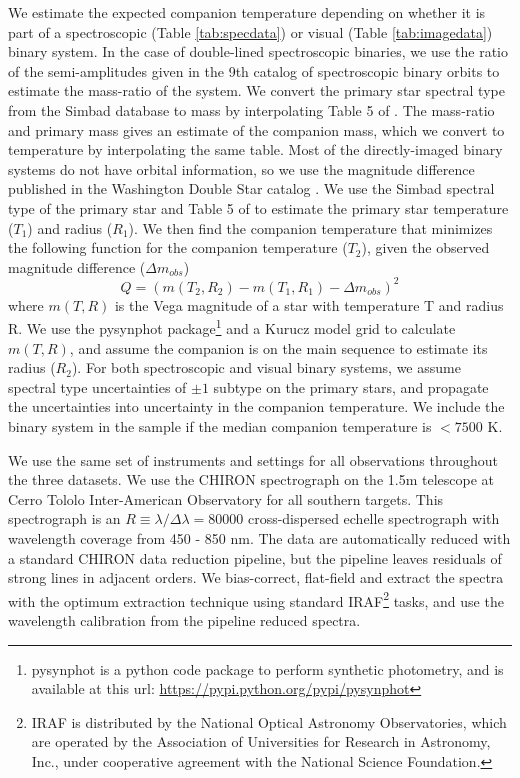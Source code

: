 \documentclass{emulateapj}
\begin{document}
We estimate the expected companion temperature depending on whether it is part of a spectroscopic (Table \ref{tab:specdata}) or visual (Table \ref{tab:imagedata}) binary system. In the case of double-lined spectroscopic binaries, we use the ratio of the semi-amplitudes given in the 9th catalog of spectroscopic binary orbits \citep[SB9,][]{SB9} to estimate the mass-ratio of the system. We convert the primary star spectral type from the Simbad database \citep{Simbad} to mass by interpolating Table 5 of \citet{Pecaut2013}. The mass-ratio and primary mass gives an estimate of the companion mass, which we convert to temperature by interpolating the same table. Most of the directly-imaged binary systems do not have orbital information, so we use the magnitude difference published in the Washington Double Star catalog \citep[WDS, ][]{WDS}. We use the Simbad spectral type of the primary star and Table 5 of \citet{Pecaut2013} to estimate the primary star temperature ($T_1$) and radius ($R_1$). We then find the companion temperature that minimizes the following function for the companion temperature ($T_2$), given the observed magnitude difference ($\Delta m_{obs}$)
\begin{equation}
Q = (m(T_2, R_2) - m(T_1, R_1) - \Delta m_{obs})^2
\label{eqn:secteff}
\end{equation}
where $m(T, R)$ is the Vega magnitude of a star with temperature T and radius R. We use the pysynphot package\footnote{pysynphot is a python code package to perform synthetic photometry, and is available at this url: \url{https://pypi.python.org/pypi/pysynphot}} and a Kurucz model grid \citep{Castelli2003} to calculate $m(T, R)$, and assume the companion is on the main sequence to estimate its radius ($R_2$). For both spectroscopic and visual binary systems, we assume spectral type uncertainties of $\pm 1$ subtype on the primary stars, and propagate the uncertainties into uncertainty in the companion temperature. We include the binary system in the sample if the median companion temperature is $< 7500$ K. 

We use the same set of instruments and settings for all observations throughout the three datasets. We use the CHIRON spectrograph \citep{CHIRON} on the 1.5m telescope at Cerro Tololo Inter-American Observatory for all southern targets. This spectrograph is an $R\equiv \lambda / \Delta \lambda = 80000$ cross-dispersed echelle spectrograph with wavelength coverage from 450 - 850 nm. The data are automatically reduced with a standard CHIRON data reduction pipeline, but the pipeline leaves residuals of strong lines in adjacent orders. We bias-correct, flat-field and extract the spectra with the optimum extraction technique \citep{Horne1986} using standard IRAF\footnote{IRAF is distributed by the National Optical Astronomy Observatories, which are operated by the Association of Universities for Research in Astronomy, Inc., under cooperative agreement with the National Science Foundation.} tasks, and use the wavelength calibration from the pipeline reduced spectra.
\end{document}
